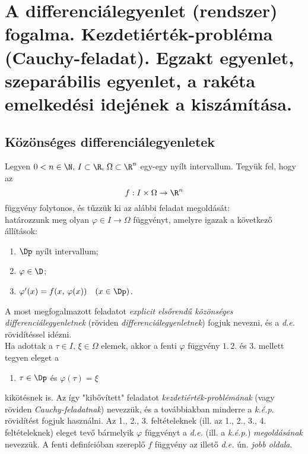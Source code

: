 \newpage
\section{A differenciálegyenlet (rendszer) fogalma. Kezdetiérték-probléma (Cauchy-feladat). Egzakt egyenlet, szeparábilis egyenlet, a rakéta emelkedési idejének a kiszámítása.}
\subsection{Közönséges differenciálegyenletek}
Legyen $0 < n \in \N, \, I \subset \R, \, \Omega \subset \R^n$ egy-egy nyílt intervallum. Tegyük fel, hogy az
\[
f : I \times \Omega \to \R^n
\]    
függvény folytonos, és tűzzük ki az alábbi feladat megoldását:\\

határozzunk meg olyan $\varphi \in I \to \Omega$ függvényt, amelyre igazak a következő állítások:
\begin{enumerate}
	\item $\Dp$ nyílt intervallum;
	\item $\varphi \in \D$;
	\item $\varphi'(x) = f(x, \, \varphi(x)) \quad (x \in \Dp)$.
\end{enumerate}
A most megfogalmazott feladatot \textit{explicit elsőrendű közönséges differenciálegyenletnek} (röviden \textit{differenciálegyenletnek}) fogjuk nevezni, és a \textit{d.e.} rövidítéssel idézni.\\

Ha adottak a $\tau \in I, \, \xi \in \Omega$ elemek, akkor a fenti $\varphi$ függvény $1. \, 2.$ és 3. mellett tegyen eleget a
\begin{enumerate}[start=4]
	\item $\tau \in \Dp$ és $\varphi(\tau) = \xi$
\end{enumerate}
kikötésnek is. Az így "kibővített" feladatot \textit{kezdetiérték-problémának} (vagy röviden \textit{Cauchy-feladatnak}) nevezzük, és a továbbiakban minderre a \textit{k.é.p.} rövidítést fogjuk használni. Az 1., 2., 3. feltételeknek (ill. az 1., 2., 3., 4. feltételeknek) eleget tevő bármelyik $\varphi$ függvényt a \textit{d.e.} (ill. a \textit{k.é.p.}) \textit{megoldásának} nevezzük. A fenti definícióban szereplő $f$ függvény az illető \textit{d.e.} ún. \textit{jobb oldala}.

